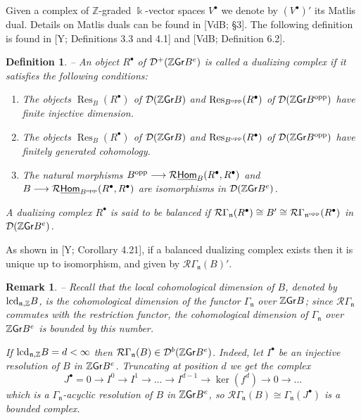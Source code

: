 \documentclass[twoside,11pt]{article}
\newcommand{\lcd}{{\rm lcd}}
\renewcommand{\k}{\Bbbk}
\newcommand{\Z}{{\mathbb Z}}
\newcommand{\D}{{\mathcal D}}
\newcommand{\R}{{\mathcal R}}
\newcommand{\n}{{\mathfrak n}}
\newcommand{\GrMod}{{\sf Gr}}
\newcommand{\HOM}{\underline{{\sf Hom}}}
\newcommand{\opp}{{\rm opp}}
\DeclareMathOperator{\Res}{Res}
\newtheorem{subdefinition}[subtheorem]{Definition}
\newtheorem{subremark}[subtheorem]{Remark}
\begin{document}
Given a complex of $\Z$-graded $\k$-vector spaces $V^\bullet$ we denote by $(V^\bullet)'$ its
Matlis dual. Details on Matlis duals can be found in [VdB; \S 3]. The following definition
is found in [Y; Definitions 3.3 and 4.1] and [VdB; Definition 6.2].
\begin{subdefinition} -- \label{def-DC}
An object $R^\bullet$ of $\D^+(\Z\GrMod B^e)$ is called a \emph{dualizing complex} if it
satisfies the following conditions:
\begin{enumerate}
\item The objects $\Res_B(R^\bullet)$ of $\D(\Z\GrMod B )$ and $\Res_{B^\opp}(R^\bullet)$
of $\D(\Z\GrMod B^\opp)$ have finite injective dimension.

\item The objects $\Res_B(R^\bullet)$ of $\D(\Z\GrMod B )$ and $\Res_{B^\opp}(R^\bullet)$
of $\D(\Z\GrMod B^\opp)$ have finitely generated cohomology.

\item The natural morphisms $B^\opp \longrightarrow \R\HOM_B(R^\bullet,R^\bullet)$ and $B
\longrightarrow \R\HOM_{B^\opp} (R^\bullet,R^\bullet)$ are
isomorphisms in $\D(\Z\GrMod B^e)$.
\end{enumerate}
A dualizing complex $R^\bullet$ is said to be \emph{balanced} if $\R \Gamma_\n(R^\bullet)
\cong B' \cong \R \Gamma_{\n^\opp}(R^\bullet)$ in $\D(\Z\GrMod B^e)$. 
\end{subdefinition}
As shown in [Y; Corollary 4.21], if a balanced dualizing complex exists then it is
unique up to isomorphism, and given by $\R\Gamma_\n(B)'$.

\begin{subremark} -- \label{flcd-et-borne} \rm 
Recall that the local cohomological dimension of $B$, denoted by $\lcd_{\n, \Z}B$, is the
cohomological dimension of the functor $\Gamma_\n$ over $\Z\GrMod B$; since $\R\Gamma_\n$
commutes with the restriction functor, the cohomological dimension of $\Gamma_\n$ over
$\Z\GrMod B^e$ is bounded by this number.

If $\lcd_{\n,\Z} B = d < \infty$ then $\R\Gamma_\n(B) \in \D^b(\Z\GrMod B^e)$. Indeed,
let $I^\bullet$ be an injective resolution of $B$ in $\Z\GrMod B^e$. Truncating at
position $d$ we get the complex
\[
J^\bullet = 0 \longrightarrow I^0 \longrightarrow I^1 \longrightarrow \dots
\longrightarrow I^{d-1} \longrightarrow \ker(f^d) \longrightarrow 0 \longrightarrow \dots
\]
which is a $\Gamma_\n$-acyclic resolution of $B$ in $\Z\GrMod B^e$, so $\R \Gamma_\n(B)
\cong \Gamma_\n(J^\bullet)$ is a bounded complex.
\end{subremark}
\end{document}
